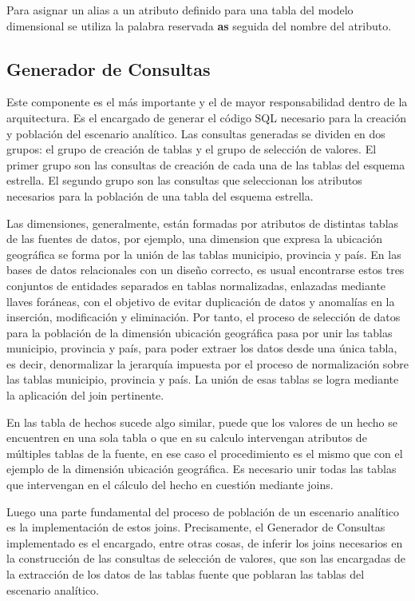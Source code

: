 Para asignar un alias a un atributo definido para una tabla del modelo dimensional se utiliza la 
palabra reservada \textbf{as} seguida del nombre del atributo.


\subsection{Generador de Consultas}

Este componente es el m\'as importante y el de mayor responsabilidad dentro de la arquitectura. Es el encargado 
de generar el código SQL necesario para la creación y población del escenario analítico. Las consultas generadas 
se dividen en dos grupos: el grupo de creación de tablas y el grupo de selección de valores. El primer grupo 
son las consultas de creación de cada una de las tablas del esquema estrella. El segundo grupo son las  consultas 
que seleccionan los atributos necesarios para la población de una tabla del esquema estrella. 

Las dimensiones, generalmente, est\'an formadas por atributos de distintas tablas de las fuentes de datos, por 
ejemplo, una dimension que expresa la ubicación geográfica se forma por la uni\'on de las tablas municipio, 
provincia y pa\'is. En las bases de datos relacionales con un diseño correcto, es usual encontrarse estos 
tres conjuntos de entidades separados en tablas normalizadas, enlazadas mediante llaves for\'aneas, con el objetivo 
de evitar duplicación de datos y anomalías en la inserción, modificación y eliminación. Por tanto, el 
proceso de selección de datos para la población de la dimensión ubicación geográfica pasa por unir las 
tablas municipio, provincia y pa\'is, para poder extraer los datos desde una única tabla, es 
decir, denormalizar la jerarquía impuesta por el proceso de normalización sobre las tablas municipio, provincia
y pa\'is. La uni\'on de esas tablas se logra mediante la aplicación del join pertinente.

En las tabla de hechos sucede algo similar, puede que los valores de un hecho se encuentren en una 
sola tabla o que en su calculo intervengan atributos de múltiples tablas de la fuente, en ese caso 
el procedimiento es el mismo que con el ejemplo de la dimensión ubicación geográfica. Es necesario 
unir todas las tablas que intervengan en el cálculo del hecho en cuestión mediante joins.

Luego una parte fundamental del proceso de población de un escenario analítico es la implementación 
de estos joins. Precisamente, el Generador de Consultas implementado es el encargado, entre otras cosas, de inferir los 
joins necesarios en la construcción de las consultas de selección de valores, que son las encargadas de la 
extracción de los datos de las tablas fuente que poblaran las tablas del escenario analítico.

